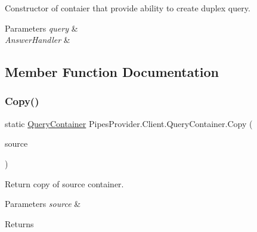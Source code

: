 Constructor of contaier that provide ability to create duplex query. 


\begin{DoxyParams}{Parameters}
{\em query} & \\
\hline
{\em Answer\+Handler} & \\
\hline
\end{DoxyParams}


\subsection{Member Function Documentation}
\mbox{\label{struct_pipes_provider_1_1_client_1_1_query_container_acfcd11bf7f6b6c9cc4e6b2ff574437bd}} 
\subsubsection{\texorpdfstring{Copy()}{Copy()}}
{\footnotesize\ttfamily static \mbox{\hyperlink{struct_pipes_provider_1_1_client_1_1_query_container}{Query\+Container}} Pipes\+Provider.\+Client.\+Query\+Container.\+Copy (\begin{DoxyParamCaption}\item[{\mbox{\hyperlink{struct_pipes_provider_1_1_client_1_1_query_container}{Query\+Container}}}]{source }\end{DoxyParamCaption})\hspace{0.3cm}{\ttfamily [static]}}



Return copy of source container. 


\begin{DoxyParams}{Parameters}
{\em source} & \\
\hline
\end{DoxyParams}
\begin{DoxyReturn}{Returns}

\end{DoxyReturn}
\mbox{\label{struct_pipes_provider_1_1_client_1_1_query_container_a0d227c39b9ecec5d8b3e739e87e171a6}} 

